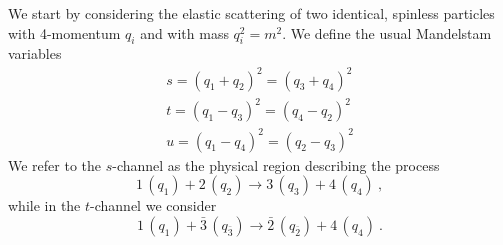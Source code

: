\begin{enumerate}
          \begin{solution}

              \noindent We start by considering the elastic scattering of two identical, spinless particles with 4-momentum $q_{i}$ and with mass $q_i^2 = m^2$.
              We define the usual Mandelstam variables
              \begin{gather}
                  s = (q_1 + q_2)^2 = (q_3 + q_4)^2 \nonumber\\
                  t = (q_1 - q_3)^2 = (q_4 - q_2)^2 \nonumber \\
                  u = (q_1 - q_4)^2 = (q_2 - q_3)^2 \nonumber
              \end{gather}
              We refer to the $s$-channel as the physical region describing the process
              \begin{equation}
                  1 \, (q_1) + 2 \, (q_2) \to 3 \, (q_3) + 4 \, (q_4) ~, \nonumber
              \end{equation}
              while in the $t$-channel we consider
              \begin{equation}
                  1 \, (q_1) + \bar{3} \, (q_{\bar{3}})
                  \to  \bar{2} \, (q_{\bar{2}}) + 4 \, (q_4) ~. \nonumber
              \end{equation}


\end{solution}
\end{enumerate}
